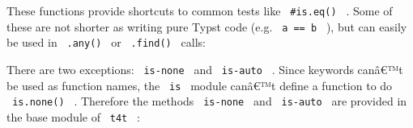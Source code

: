 \begin{Shaded}
\begin{Highlighting}[]
\OperatorTok{:}
\end{Highlighting}
\end{Shaded}

These functions provide shortcuts to common tests like
\texttt{\ \#is.eq()\ } . Some of these are not shorter as writing pure
Typst code (e.g. \texttt{\ a\ ==\ b\ } ), but can easily be used in
\texttt{\ .any()\ } or \texttt{\ .find()\ } calls:

\begin{Shaded}
\begin{Highlighting}[]
\OperatorTok{{-}}\OperatorTok{{-}}
\NormalTok{\}}

\OperatorTok{=}\OperatorTok{,}\OperatorTok{,} \OperatorTok{,}\OperatorTok{{-}}

\OperatorTok{{-}}\OperatorTok{=}\NormalTok{()}\NormalTok{(}\NormalTok{))}
\end{Highlighting}
\end{Shaded}

There are two exceptions: \texttt{\ is-none\ } and \texttt{\ is-auto\ }
. Since keywords canâ€™t be used as function names, the \texttt{\ is\ }
module canâ€™t define a function to do \texttt{\ is.none()\ } .
Therefore the methods \texttt{\ is-none\ } and \texttt{\ is-auto\ } are
provided in the base module of \texttt{\ t4t\ } :

\begin{Shaded}
\begin{Highlighting}[]
\OperatorTok{:}\OperatorTok{{-}}\OperatorTok{,}\OperatorTok{{-}}
\end{Highlighting}
\end{Shaded}

